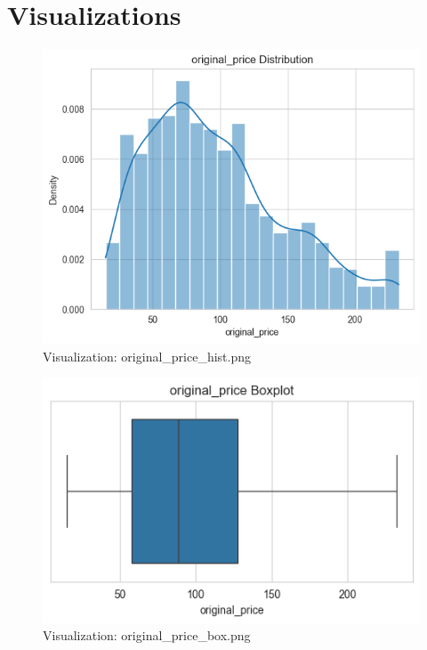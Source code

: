 \documentclass{article}%
\begin{document}
\section{Visualizations}%
\label{sec:Visualizations}%
\begin{minipage}[c]{0.48\textwidth}%


\begin{figure}[H]%
\centering%
\includegraphics[width=\linewidth]{output/plots/original_price_hist.png}%
\caption{Visualization: original\_price\_hist.png}%
\end{figure}

%
\end{minipage}%
\begin{minipage}[c]{0.48\textwidth}%


\begin{figure}[H]%
\centering%
\includegraphics[width=\linewidth]{output/plots/original_price_box.png}%
\caption{Visualization: original\_price\_box.png}%
\end{figure}

%
\end{minipage}%
\end{document}
